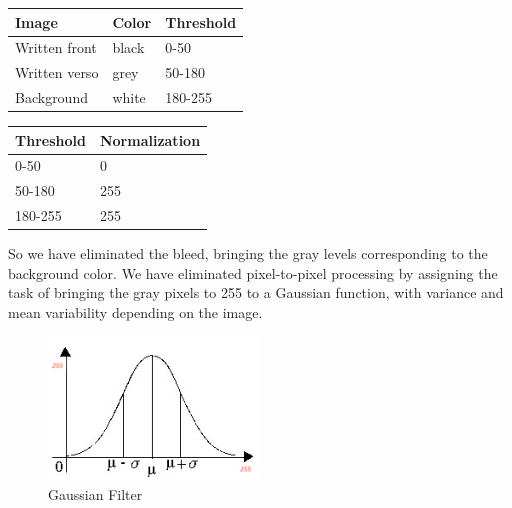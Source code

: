 \documentclass[%
 reprint,
 amsmath,amssymb,
 aps,
]{revtex4-1}
\begin{document}
\begin{table}[!ht]\footnotesize
	\centering
\begin{tabular}{l l l}
\toprule
\textbf{Image} & \textbf{Color} & \textbf{Threshold}\\
\midrule
Written front & black & 0-50 \\
Written verso & grey & 50-180 \\
Background & white & 180-255 \\
\bottomrule
\end{tabular}
\end{table}

\begin{table}[!ht]\footnotesize
	\centering
\begin{tabular}{l l}
\toprule
\textbf{Threshold} & \textbf{Normalization}\\
\midrule
0-50 & 0 \\
50-180 & 255 \\
180-255 & 255 \\
\bottomrule
\end{tabular}
\end{table}


So we have eliminated the bleed, bringing the gray levels corresponding to the background color.
We have eliminated pixel-to-pixel processing by assigning the task of bringing the gray pixels to 255 to a Gaussian function, with variance and mean variability depending on the image.
\begin{figure}[!ht]
	\centering
	\includegraphics[width=0.5\textwidth]{gaussian}
	\caption{Gaussian Filter}
	\centering
	\label{Gaussian Filter}
\end{figure}
\end{document}
